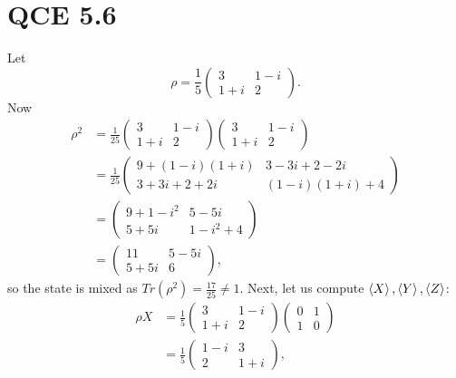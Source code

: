\documentclass[10pt]{article}
\begin{document}
\section*{QCE 5.6}
Let 
\[
\rho = \frac{1}{5} \begin{pmatrix}
3       & 1 - i \\
1 + i & 2
\end{pmatrix}.
\]
Now
\begin{align*}
\rho^2 &= \frac{1}{25} \begin{pmatrix}
3       & 1 - i \\
1 + i & 2
\end{pmatrix}
\begin{pmatrix}
3       & 1 - i \\
1 + i & 2
\end{pmatrix} \\
           &= \frac{1}{25} \begin{pmatrix}
              9 + (1 - i)(1 + i)   &   3 - 3i + 2 - 2i \\
              3 + 3i + 2 + 2i     &   (1 - i)(1 + i) + 4
           \end{pmatrix} \\
           &= \begin{pmatrix}
           9 + 1 - i^2 & 5 - 5i \\
           5 + 5i         & 1 - i^2 + 4
           \end{pmatrix} \\
           &= \begin{pmatrix}
			11        &  5 - 5i \\
			5 + 5i & 6
           \end{pmatrix},
\end{align*}
so the state is mixed as $Tr(\rho^2) = \frac{17}{25} \neq 1$. Next, let us compute $\braket{X}, \braket{Y}, \braket{Z}$:
\begin{align*}
\rho X &= \frac{1}{5} \begin{pmatrix}
         3      & 1 - i \\
         1 + i & 2
     \end{pmatrix}
    \begin{pmatrix}
        0 & 1 \\
        1 & 0 
    \end{pmatrix} \\
&= \frac{1}{5} \begin{pmatrix}
1 - i   & 3 \\
2        & 1 + i
\end{pmatrix},
\end{align*}
\end{document}
